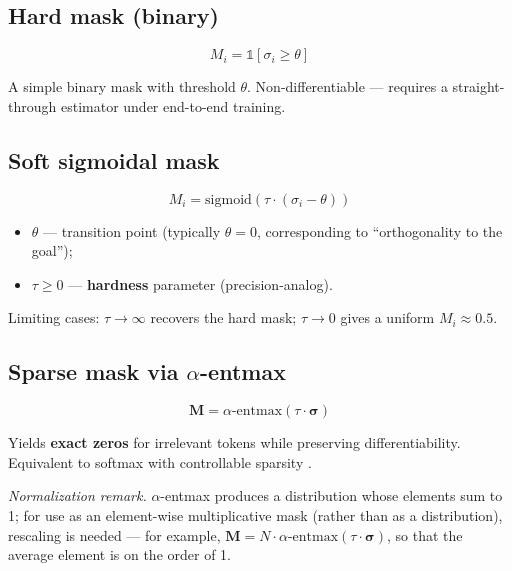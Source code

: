 \documentclass[12pt,a4paper]{article}
\begin{document}
\subsection{Hard mask (binary)}

\begin{equation}
M_i = \mathds{1}\!\left[\sigma_i \geq \theta\right]
\end{equation}

A simple binary mask with threshold $\theta$. Non-differentiable --- requires a straight-through estimator under end-to-end training.

\subsection{Soft sigmoidal mask}

\begin{equation}
M_i = \mathrm{sigmoid}\!\left(\tau \cdot (\sigma_i - \theta)\right)
\end{equation}

\begin{itemize}
    \item $\theta$ --- transition point (typically $\theta = 0$, corresponding to ``orthogonality to the goal'');
    \item $\tau \geq 0$ --- \textbf{hardness} parameter (precision-analog).
\end{itemize}

Limiting cases: $\tau \to \infty$ recovers the hard mask; $\tau \to 0$ gives a uniform $M_i \approx 0.5$.

\subsection{Sparse mask via $\alpha$-entmax}

\begin{equation}
\mathbf{M} = \alpha\text{-entmax}\!\left(\tau \cdot \boldsymbol{\sigma}\right)
\end{equation}

Yields \textbf{exact zeros} for irrelevant tokens while preserving differentiability. Equivalent to softmax with controllable sparsity \cite{peters2019sparse}.

\textit{Normalization remark.} $\alpha$-entmax produces a distribution whose elements sum to 1; for use as an element-wise multiplicative mask (rather than as a distribution), rescaling is needed --- for example, $\mathbf{M} = N \cdot \alpha\text{-entmax}(\tau \cdot \boldsymbol{\sigma})$, so that the average element is on the order of 1.
\end{document}
